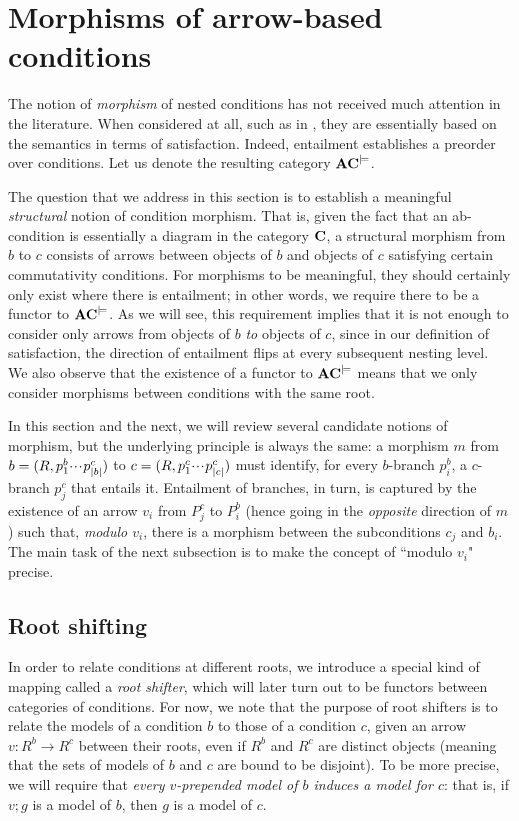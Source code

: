 \section{Morphisms of arrow-based conditions}

The notion of \emph{morphism} of nested conditions has not received much attention in the literature. When considered at all, such as in \cite{bchk:conditional-reactive-systems,sksclo:coinductive-techniques-for-satisfiability}, they are essentially based on the semantics in terms of satisfaction. Indeed, entailment establishes a preorder over conditions. Let us denote the resulting category $\mathbf{AC}^{\models}$.

The question that we address in this section is to establish a meaningful \emph{structural} notion of condition morphism. That is, given the fact that an ab-condition is essentially a diagram in the category $\mathbf{C}$, a structural morphism from $b$ to $c$ consists of arrows between objects of $b$ and objects of $c$ satisfying certain commutativity conditions. For morphisms to be meaningful, they should certainly only exist where there is entailment; in other words, we require there to be a functor to $\mathbf{AC}^{\models}$. As we will see, this requirement implies that it is not enough to consider only arrows from objects of $b$ \emph{to} objects of $c$, since in our definition of satisfaction, the direction of entailment flips at every subsequent nesting level. We also observe that the existence of a functor to $\mathbf{AC}^{\models}$ means that we only consider morphisms between conditions with the same root.

In this section and the next, we will review several candidate notions of morphism, but the underlying principle is always the same: a morphism $m$ from $b=(R,p^b_1{\cdotp\mkern-2mu\cdotp\mkern-2mu\cdotp\mkern1mu} p^c_{|b|})$ to $c=(R,p^c_1{\cdotp\mkern-2mu\cdotp\mkern-2mu\cdotp\mkern1mu} p^c_{|c|})$ must identify, for every $b$-branch $p^b_i$, a $c$-branch $p^c_j$ that entails it. Entailment of branches, in turn, is captured by the existence of an arrow $v_i$ from $P^c_j$ to $P^b_i$ (hence going in the \emph{opposite} direction of $m$) such that, \emph{modulo $v_i$}, there is a morphism between the subconditions $c_j$ and $b_i$. The main task of the next subsection is to make the concept of ``modulo $v_i$" precise.

\subsection{Root shifting}

In order to relate conditions at different roots, we introduce a special kind of mapping called a \emph{root shifter}, which will later turn out to be functors between categories of conditions. For now, we note that the purpose of root shifters is to relate the models of a condition $b$ to those of a condition $c$, given an arrow $v:R^b\to R^c$ between their roots, even if $R^b$ and $R^c$ are distinct objects (meaning that the sets of models of $b$ and $c$ are bound to be disjoint). To be more precise, we will require that \emph{every $v$-prepended model of $b$ induces a model for $c$}: that is, if $v;g$ is a model of $b$, then $g$ is a model of $c$.


